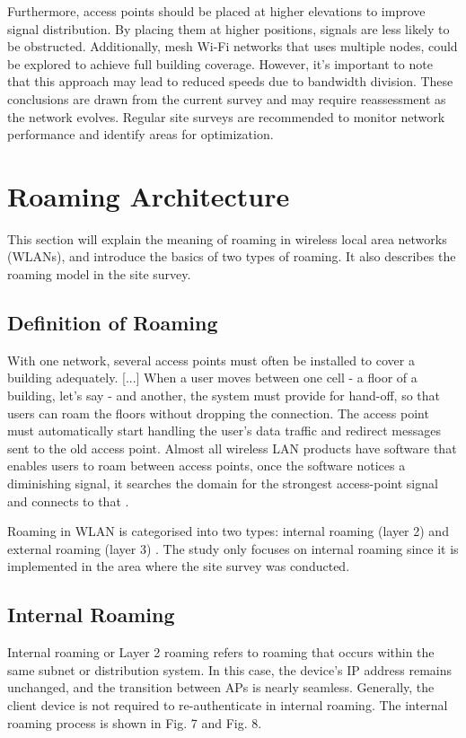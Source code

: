 \documentclass[conference]{IEEEtran}
\begin{document}
Furthermore, access points should be placed at higher elevations to improve signal distribution. By placing them at higher positions, signals are less likely to be obstructed. Additionally, mesh Wi-Fi networks that uses multiple nodes, could be explored to achieve full building coverage. However, it's important to note that this approach may lead to reduced speeds due to bandwidth division. These conclusions are drawn from the current survey and may require reassessment as the network evolves. Regular site surveys are recommended to monitor network performance and identify areas for optimization.

\section{Roaming Architecture}

This section will explain the meaning of roaming in wireless local area networks (WLANs), and introduce the basics of two types of roaming. It also describes the roaming model in the site survey.

\subsection{Definition of Roaming}

With one network, several access points must often be installed to cover a building adequately. [...] When a user moves between one cell - a floor of a building, let's say - and another, the system must provide for hand-off, so that users can roam the floors without dropping the connection. The access point must automatically start handling the user's data traffic and redirect messages sent to the old access point. Almost all wireless LAN products have software that enables users to roam between access points, once the software notices a diminishing signal, it searches the domain for the strongest access-point signal and connects to that \cite{wickelgren1996}.

Roaming in WLAN is categorised into two types: internal roaming (layer 2) and external roaming (layer 3) \cite{wiki_roaming}. The study only focuses on internal roaming since it is implemented in the area where the site survey was conducted.

\subsection{Internal Roaming}

Internal roaming or Layer 2 roaming  refers to roaming that occurs within the same subnet or distribution system. In this case, the device’s IP address remains unchanged, and the transition between APs is nearly seamless. Generally, the client device is not required to re-authenticate in internal roaming. The internal roaming process is shown in Fig. 7 and Fig. 8.
\end{document}
